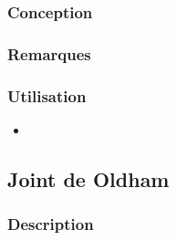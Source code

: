 \documentclass[11pt,oneside]{article}
\begin{document}
\subsubsection{Conception}
\subsubsection{Remarques}
\subsubsection{Utilisation}
\begin{itemize}
\item
\end{itemize}

\newpage

\subsection{Joint de Oldham}
\subsubsection{Description}
\end{document}
